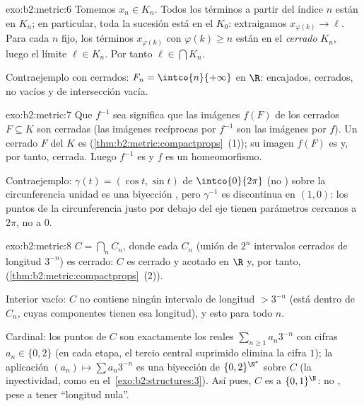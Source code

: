 \begin{solution}{exo:b2:metric:6}
Tomemos $x_n \in K_n$. Todos los términos a partir del índice $n$
están en $K_n$; en particular, toda la sucesión está en el
 $K_0$: extraigamos $x_{\varphi(k)} \to \ell$. Para cada $n$
fijo, los términos $x_{\varphi(k)}$ con $\varphi(k) \geq n$ están en
el \emph{cerrado} $K_n$, luego el límite $\ell \in K_n$. Por tanto
$\ell \in \bigcap K_n$.

Contraejemplo con cerrados: $F_n = \intco{n}{+\infty}$ en $\R$:
encajados, cerrados, no vacíos y de intersección vacía.
\end{solution}

\begin{solution}{exo:b2:metric:7}
Que $f^{-1}$ sea  significa que las imágenes $f(F)$ de los
cerrados $F \subseteq K$ son cerradas (las imágenes recíprocas por
$f^{-1}$ son las imágenes por $f$). Un cerrado $F$ del  $K$
es  (\cref{thm:b2:metric:compactprops}~(1)); su imagen
 $f(F)$ es  y, por tanto, cerrada. Luego $f^{-1}$
es  y $f$ es un homeomorfismo.

Contraejemplo: $\gamma(t) = (\cos t, \sin t)$ de $\intco{0}{2\pi}$
(no ) sobre la circunferencia unidad es una biyección
, pero $\gamma^{-1}$ es discontinua en $(1,0)$: los puntos
de la circunferencia justo por debajo del eje tienen parámetros
cercanos a $2\pi$, no a $0$.
\end{solution}

\begin{solution}{exo:b2:metric:8}
$C = \bigcap_n C_n$, donde cada $C_n$ (unión de $2^n$ intervalos
cerrados de longitud $3^{-n}$) es cerrado: $C$ es cerrado y acotado
en $\R$ y, por tanto, 
(\cref{thm:b2:metric:compactprops}~(2)).

Interior vacío: $C$ no contiene ningún intervalo de longitud $>
3^{-n}$ (está dentro de $C_n$, cuyas componentes tienen esa
longitud), y esto para todo $n$.

Cardinal: los puntos de $C$ son exactamente los reales
$\sum_{n\geq1} a_n 3^{-n}$ con cifras $a_n \in \{0, 2\}$ (en cada
etapa, el tercio central suprimido elimina la cifra $1$); la
aplicación $(a_n) \mapsto \sum a_n 3^{-n}$ es una biyección de
$\{0,2\}^{\N^*}$ sobre $C$ (la inyectividad, como en el~\cref{exo:b2:structures:3}). Así pues, $C$ es  a
$\{0,1\}^{\N}$: no , pese a tener ``longitud nula''.
\end{solution}

